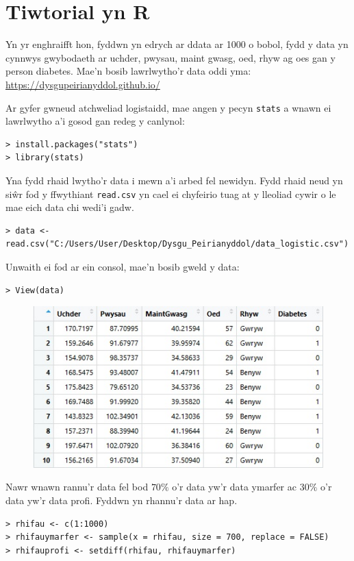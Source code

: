 \section{Tiwtorial yn R}

Yn yr enghraifft hon, fyddwn yn edrych ar ddata ar 1000 o bobol, fydd y data yn cynnwys gwybodaeth ar uchder, pwysau, maint gwasg, oed, rhyw ag oes gan y person diabetes. Mae'n bosib lawrlwytho'r data oddi yma: \url{https://dysgupeirianyddol.github.io/}

Ar gyfer gwneud atchweliad logistaidd, mae angen y pecyn \texttt{stats} a wnawn ei lawrlwytho a'i gosod gan redeg y canlynol:

\begin{verbatim}
> install.packages("stats")
> library(stats)
\end{verbatim}

Yna fydd rhaid lwytho'r data i mewn a'i arbed fel newidyn. Fydd rhaid neud yn si\^{w}r fod y ffwythiant \texttt{read.csv} yn cael ei chyfeirio tuag at y lleoliad cywir o le mae eich data chi wedi'i gadw.

\begin{verbatim}
> data <- read.csv("C:/Users/User/Desktop/Dysgu_Peirianyddol/data_logistic.csv")
\end{verbatim}

Unwaith ei fod ar ein consol, mae'n bosib gweld y data:

\begin{verbatim}
> View(data)
\end{verbatim}

\begin{figure}[H]
\begin{center}
\includegraphics[width=0.5\linewidth]{../img/data_diabetes_r.jpg}
\end{center}
\end{figure}

Nawr wnawn rannu'r data fel bod $70\%$ o'r data yw'r data ymarfer ac $30\%$ o'r data yw'r data profi. Fyddwn yn rhannu'r data ar hap. 

\begin{verbatim}
> rhifau <- c(1:1000)
> rhifauymarfer <- sample(x = rhifau, size = 700, replace = FALSE)
> rhifauprofi <- setdiff(rhifau, rhifauymarfer)
\end{verbatim}

